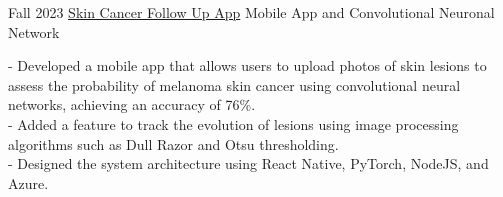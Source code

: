 \documentclass[9pt]{developercv} %
\begin{document}


\begin{entrylist}
	\entry
		{Fall 2023}
		{\href{https://github.com/EstebanOlmedo/melanoma-tt}{ Skin Cancer Follow Up App}}
		{Mobile App and Convolutional Neuronal Network}
		{
			- Developed a mobile app that allows users to upload photos of skin lesions to assess the probability of melanoma skin cancer using convolutional neural networks, achieving an accuracy of 76\%.\\
			- Added a feature to track the evolution of lesions using image processing algorithms such as Dull Razor and Otsu thresholding.\\
			- Designed the system architecture using React Native, PyTorch, NodeJS, and Azure.

		}
\end{entrylist}

\end{document}
